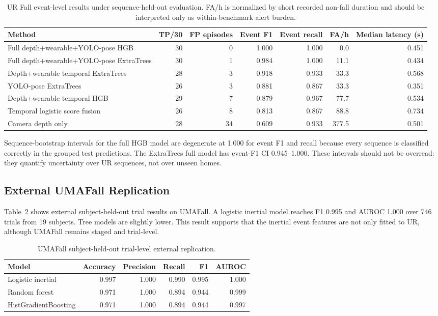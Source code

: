 \documentclass[journal]{IEEEtran}
\begin{document}
\begin{table}[t]
\centering
\caption{UR Fall event-level results under sequence-held-out evaluation. FA/h is normalized by short recorded non-fall duration and should be interpreted only as within-benchmark alert burden.}
\label{tab:ur}
\begin{tabular}{lrrrrrr}
\toprule
Method & TP/30 & FP episodes & Event F1 & Event recall & FA/h & Median latency (s) \\
\midrule
Full depth+wearable+YOLO-pose HGB & 30 & 0 & 1.000 & 1.000 & 0.0 & 0.451 \\
Full depth+wearable+YOLO-pose ExtraTrees & 30 & 1 & 0.984 & 1.000 & 11.1 & 0.434 \\
Depth+wearable temporal ExtraTrees & 28 & 3 & 0.918 & 0.933 & 33.3 & 0.568 \\
YOLO-pose ExtraTrees & 26 & 3 & 0.881 & 0.867 & 33.3 & 0.351 \\
Depth+wearable temporal HGB & 29 & 7 & 0.879 & 0.967 & 77.7 & 0.534 \\
Temporal logistic score fusion & 26 & 8 & 0.813 & 0.867 & 88.8 & 0.734 \\
Camera depth only & 28 & 34 & 0.609 & 0.933 & 377.5 & 0.501 \\
\bottomrule
\end{tabular}
\end{table}

Sequence-bootstrap intervals for the full HGB model are degenerate at 1.000 for event F1 and recall because every sequence is classified correctly in the grouped test predictions. The ExtraTrees full model has event-F1 CI 0.945--1.000. These intervals should not be overread: they quantify uncertainty over UR sequences, not over unseen homes.

\subsection{External UMAFall Replication}
Table~\ref{tab:umafall} shows external subject-held-out trial results on UMAFall. A logistic inertial model reaches F1 0.995 and AUROC 1.000 over 746 trials from 19 subjects. Tree models are slightly lower. This result supports that the inertial event features are not only fitted to UR, although UMAFall remains staged and trial-level.

\begin{table}[t]
\centering
\caption{UMAFall subject-held-out trial-level external replication.}
\label{tab:umafall}
\begin{tabular}{lrrrrr}
\toprule
Model & Accuracy & Precision & Recall & F1 & AUROC \\
\midrule
Logistic inertial & 0.997 & 1.000 & 0.990 & 0.995 & 1.000 \\
Random forest & 0.971 & 1.000 & 0.894 & 0.944 & 0.999 \\
HistGradientBoosting & 0.971 & 1.000 & 0.894 & 0.944 & 0.997 \\
\bottomrule
\end{tabular}
\end{table}
\end{document}
